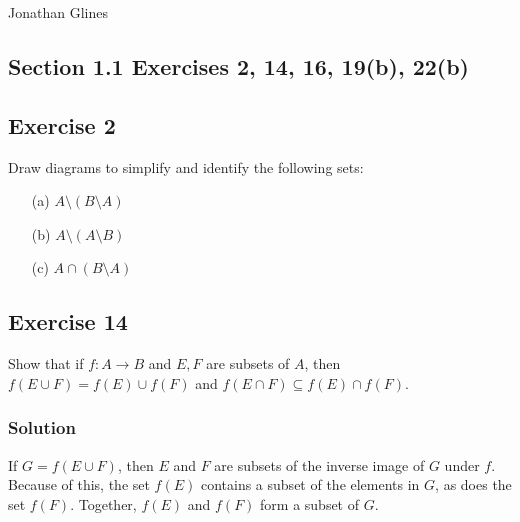 \documentclass[12pt]{article}
\begin{document}
\begin{flushright}
\Large{Jonathan Glines}
\end{flushright}
\begin{flushleft}
\section*{Section 1.1 Exercises 2, 14, 16, 19(b), 22(b)}
\subsection*{Exercise 2} Draw diagrams to simplify and identify the following sets:
\begin{enumerate}
\item[(a)] $A\setminus\left(B \setminus A\right)$
\newline
\newline
\newline
\newline
\newline
\newline
\newline
\item[(b)] $A\setminus\left(A \setminus B\right)$
\newline
\newline
\newline
\newline
\newline
\newline
\newline
\item[(c)] $A \cap \left(B \setminus A\right)$
\newline
\newline
\newline
\newline
\newline
\newline
\newline
\end{enumerate}

\subsection*{Exercise 14}
Show that if $f : A \rightarrow B$ and $E, F$ are subsets of $A$, then $f\left(E \cup F\right) = f\left(E\right) \cup f \left(F\right)$ and $f\left(E \cap F\right) \subseteq f\left(E\right)\cap f\left(F\right)$.
\subsubsection*{Solution}
If $G = f\left( E \cup F \right)$, then $E$ and $F$ are subsets of the inverse image of $G$ under $f$. Because of this, the set $f\left(E\right)$ contains a subset of the elements in $G$, as does the set $f\left(F\right)$. Together, $f\left(E\right)$ and $f\left(F\right)$ form a subset of $G$.


\end{flushleft}
\end{document}
